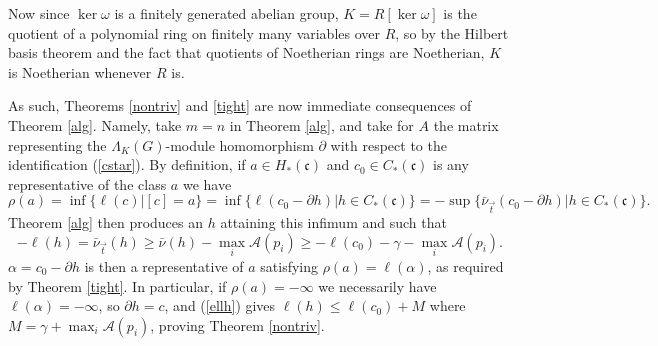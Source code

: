 \documentclass{amsart}
\theoremstyle{plain}
\theoremstyle{definition}
\theoremstyle{remark}
\def\barnu{\bar{\nu}}
\begin{document}
Now since $\ker\omega$ is a finitely generated abelian group, $K=R[\ker\omega]$ is the quotient of a polynomial ring on finitely many variables over $R$, so by the Hilbert basis theorem and the fact that quotients of Noetherian rings are Noetherian, $K$ is Noetherian whenever $R$ is.

As such, Theorems \ref{nontriv} and \ref{tight} are now immediate consequences of Theorem \ref{alg}.  Namely, take $m=n$ in Theorem \ref{alg}, and take for $A$ the matrix representing the $\Lambda_K(G)$-module homomorphism $\partial$ with respect to the identification (\ref{cstar}).  By definition, if $a\in H_*(\mathfrak{c})$ and $c_0\in C_*(\mathfrak{c})$ is any representative of the class $a$ we have \[ \rho(a)=\inf\{\ell(c)|[c]=a\}=\inf\{\ell(c_0-\partial h)|h\in C_*(\mathfrak{c})\}=-\sup\{\barnu_{\vec{t}}(c_0-\partial h)|h\in C_*(\mathfrak{c})\}.\]  Theorem \ref{alg} then produces an $h$ attaining this infimum and such that \begin{equation}\label{ellh} -\ell(h)=\barnu_{\vec{t}}(h)\geq \barnu(h)-\max_i\mathcal{A}(p_i)\geq -\ell(c_0)-\gamma-\max_i\mathcal{A}(p_i).\end{equation}  $\alpha=c_0-\partial h$ is then a representative of $a$ satisfying $\rho(a)=\ell(\alpha)$, as required by Theorem \ref{tight}.  In particular, if $\rho(a)=-\infty$ we necessarily have $\ell(\alpha)=-\infty$, so $\partial h=c$, and (\ref{ellh}) gives $\ell(h)\leq \ell(c_0)+M$ where $M=\gamma+\max_i\mathcal{A}(p_i)$, proving Theorem \ref{nontriv}.
\end{document}
